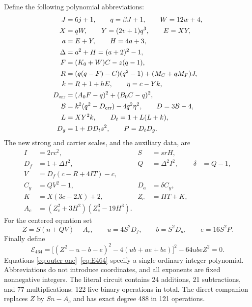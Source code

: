 Define the following polynomial abbreviations:
\begin{align}
 J&=6j+1,\qquad q=\beta J+1,\qquad W=12w+4,\nonumber\\
 X&=qW,\qquad Y=(2v+1)q^3,\qquad E=XY,\nonumber\\
 a&=E+Y,\qquad H=4a+3,\nonumber\\
 \Delta&=a^2+H=(a+2)^2-1,\label{eq:outer-one}\\
 F&=(K_0+W)C-z(q-1),\nonumber\\
 R&=(q(q-F)-C)(q^2-1)+(M_C+qM_F)J,\nonumber\\
 k&=R+1+hE,\qquad \eta=c-Yk,\label{eq:outer-two}\\
 D_{\rm err}&=(A_0F-q)^2+(B_0C-q)^2,\nonumber\\
 \mathcal B&=k^2(q^2-D_{\rm err})-4q^2\eta^2,\qquad D=3\mathcal B-4,\label{eq:budget}\\
 L&=XY^2k,\qquad D_t=1+L(L+k),\nonumber\\
 D_g&=1+D D_t s^2,\qquad P=D_tD_g.\label{eq:guard}
\end{align}
The new strong and carrier scales, and the auxiliary data, are
\begin{align}
 I&=2rc^2, & S&=srH,\label{eq:new-scales}\\
 D_f&=1+\Delta I^2, & Q&=\Delta^2 I^2, & \delta&=Q-1,\nonumber\\
 V&=D_f(c-R+4IT)-c,\nonumber\\
 C_y&=QV^2-1, & D_a&=\delta C_y,\label{eq:auxiliary}\\
 K&=X(3c-2X)+2, & Z_c&=HT+K,\nonumber\\
 A_c&=(Z_c^2+3H^2)(Z_c^3-19H^3).\label{eq:carrier}
\end{align}
For the centered equation set
\begin{equation}
 Z=S(n+QV)-A_c,\qquad
 u=4S^2D_f,\qquad b=S^2D_a,\qquad e=16S^2P.
 \label{eq:three-roots}
\end{equation}
Finally define
\begin{equation}
 \boxed{\displaystyle
 \mathcal E_{464}=
 \bigl[(Z^2-u-b-e)^2-4(ub+ue+be)\bigr]^2
       -64ubeZ^2=0.}
 \label{eq:E464}
\end{equation}
Equations \eqref{eq:outer-one}--\eqref{eq:E464} specify a single
ordinary integer polynomial. Abbreviations do not introduce coordinates,
and all exponents are fixed nonnegative integers. The literal circuit
contains 24 additions, 21 subtractions, and 77 multiplications: 122 live
binary operations in total. The direct companion replaces $Z$ by
$Sn-A_c$ and has exact degree 488 in 121 operations.

